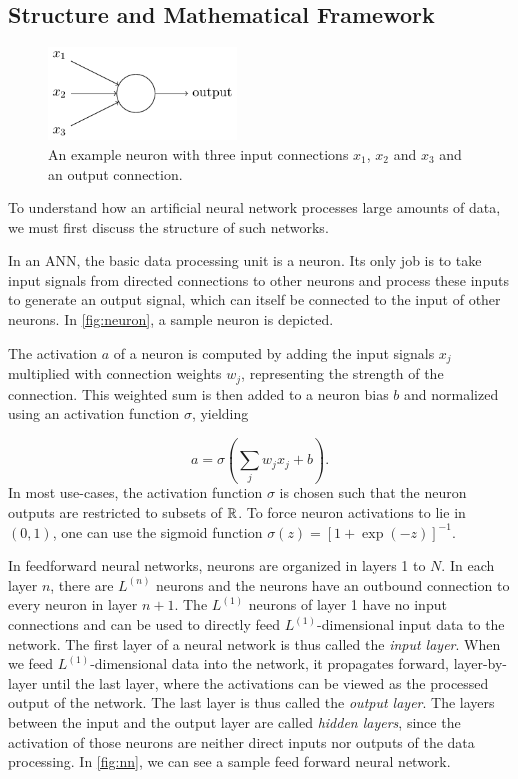 \subsection{Structure and Mathematical Framework}

\begin{figure}
  \includegraphics[width=5cm]{media/neuron.png}
  \caption{
    An example neuron with three input connections $x_1$, $x_2$ and
    $x_3$ and an output connection. \cite{nielsen}
  }
  \label{fig:neuron}
\end{figure}
To understand how an artificial neural network processes large amounts of data,
we must first discuss the structure of such networks.

In an ANN, the basic data processing unit is a neuron. Its only job is to take
input signals from directed connections to other neurons and process these inputs to generate an output signal, which can itself be connected to the input of other neurons. In \autoref{fig:neuron}, a sample neuron is depicted.

The activation $a$ of a neuron is computed by adding the input signals $x_j$ multiplied with connection weights $w_j$, representing the strength of the connection. This weighted sum is then added to a neuron bias $b$ and normalized using an activation function $\sigma$, yielding

\begin{equation}
  a = \sigma\left(\sum_j w_j x_j + b\right).
\end{equation}
In most use-cases, the activation function $\sigma$ is chosen such that the
neuron outputs are restricted to subsets of $\mathbb{R}$. To force neuron activations
to lie in $(0,1)$, one can use the sigmoid function
$\sigma(z) = [1+\exp(-z)]^{-1}$.

In feedforward neural networks, neurons are organized in layers 1 to $N$.
In each layer $n$, there are $L^{(n)}$ neurons and the neurons have an outbound connection to every neuron in layer $n+1$.
The $L^{(1)}$ neurons of layer 1 have no input connections and can be used to directly feed $L^{(1)}$-dimensional input data to the network.
The first layer of a neural network is thus called the \textit{input layer}.
When we feed $L^{(1)}$-dimensional data into the network, it propagates forward, layer-by-layer until the last layer, where the activations can be viewed as the processed output of the network. The last layer is thus called the \textit{output layer}.
The layers between the input and the output layer are called \textit{hidden layers}, since the activation of those neurons are neither direct inputs nor outputs of the data processing. In \autoref{fig:nn}, we can see a sample feed forward neural network.


